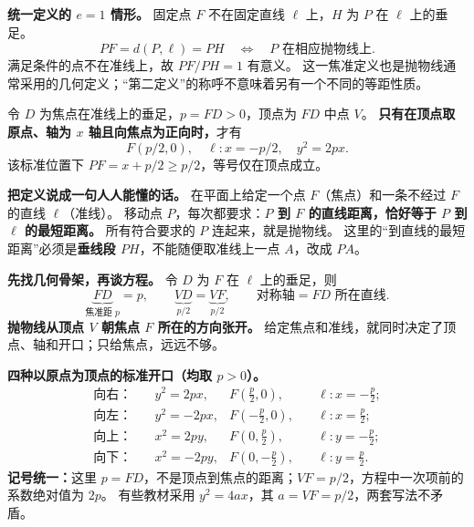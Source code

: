 \begin{statementbox}
\textbf{统一定义的 $e=1$ 情形。} 固定点 $F$ 不在固定直线 $\ell$ 上，$H$ 为 $P$ 在 $\ell$ 上的垂足。
\[
\boxed{PF=d(P,\ell)=PH}\quad\Longleftrightarrow\quad P\text{ 在相应抛物线上}.
\]
满足条件的点不在准线上，故 $PF/PH=1$ 有意义。
这一焦准定义也是抛物线通常采用的几何定义；“第二定义”的称呼不意味着另有一个不同的等距性质。

令 $D$ 为焦点在准线上的垂足，$p=FD>0$，顶点为 $FD$ 中点 $V$。
\textbf{只有在顶点取原点、轴为 $x$ 轴且向焦点为正向时，}才有
\[
F(p/2,0),\quad \ell:x=-p/2,\quad \boxed{y^2=2px}.
\]
该标准位置下 $PF=x+p/2\ge p/2$，等号仅在顶点成立。
\end{statementbox}

\begin{statementbox}
\textbf{把定义说成一句人人能懂的话。}
在平面上给定一个点 $F$（焦点）和一条不经过 $F$ 的直线 $\ell$（准线）。
移动点 $P$，每次都要求：\textbf{$P$ 到 $F$ 的直线距离，恰好等于 $P$ 到 $\ell$ 的最短距离。}
所有符合要求的 $P$ 连起来，就是抛物线。
这里的“到直线的最短距离”必须是\textbf{垂线段 $PH$}，不能随便取准线上一点 $A$，改成 $PA$。

\medskip
\textbf{先找几何骨架，再谈方程。}
令 $D$ 为 $F$ 在 $\ell$ 上的垂足，则
\[
\underbrace{FD}_{\text{焦准距 }p}
= p,\qquad
\underbrace{VD}_{p/2}=\underbrace{VF}_{p/2},\qquad
\text{对称轴}=FD\text{ 所在直线}.
\]
\textbf{抛物线从顶点 $V$ 朝焦点 $F$ 所在的方向张开。}
给定焦点和准线，就同时决定了顶点、轴和开口；只给焦点，远远不够。

\medskip
\textbf{四种以原点为顶点的标准开口（均取 $p>0$）。}
\[
\begin{aligned}
\text{向右：}\quad & y^2= 2px, &F\!\left(\frac p2,0\right),&\quad \ell:x=-\frac p2;\\
\text{向左：}\quad & y^2=-2px, &F\!\left(-\frac p2,0\right),&\quad \ell:x= \frac p2;\\
\text{向上：}\quad & x^2= 2py, &F\!\left(0,\frac p2\right),&\quad \ell:y=-\frac p2;\\
\text{向下：}\quad & x^2=-2py, &F\!\left(0,-\frac p2\right),&\quad \ell:y= \frac p2.
\end{aligned}
\]
\textbf{记号统一：}这里 $p=FD$，不是顶点到焦点的距离；$VF=p/2$，方程中一次项前的系数绝对值为 $2p$。
有些教材采用 $y^2=4ax$，其 $a=VF=p/2$，两套写法不矛盾。
\end{statementbox}


